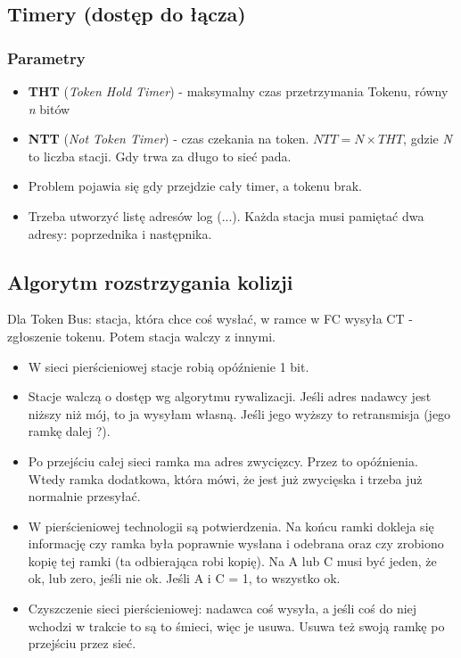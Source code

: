 			\subsection{Timery (dostęp do łącza)}
				\subsubsection{Parametry}
					\begin{itemize}
						\item \textbf{THT} (\emph{Token Hold Timer}) - maksymalny czas przetrzymania Tokenu, równy \emph{n} bitów
						\item \textbf{NTT} (\emph{Not Token Timer}) - czas czekania na token. $ NTT=N\times THT $, gdzie \emph{N} to liczba stacji. Gdy trwa za długo to sieć pada.
						\item Problem pojawia się gdy przejdzie cały timer, a tokenu brak.
						\item Trzeba utworzyć listę adresów log (...). Każda stacja musi pamiętać dwa adresy: poprzednika i następnika.
					\end{itemize}
			\subsection{Algorytm rozstrzygania kolizji}
				Dla Token Bus: stacja, która chce coś wysłać, w ramce w FC wysyła CT - zgłoszenie tokenu. Potem stacja walczy z innymi.
				\begin{itemize}
					\item W sieci pierścieniowej stacje robią opóźnienie 1 bit.
					\item Stacje walczą o dostęp wg algorytmu rywalizacji. Jeśli adres nadawcy jest niższy niż mój, to ja wysyłam własną. Jeśli jego wyższy to retransmisja (jego ramkę dalej ?).
					\item Po przejściu całej sieci ramka ma adres zwycięzcy. Przez to opóźnienia. Wtedy ramka dodatkowa, która mówi, że jest już zwycięska i trzeba już normalnie przesyłać.
					\item W pierścieniowej technologii są potwierdzenia. Na końcu ramki dokleja się informację czy ramka była poprawnie wysłana i odebrana oraz czy zrobiono kopię tej ramki (ta odbierająca robi kopię). Na A lub C musi być jeden, że ok, lub zero, jeśli nie ok. Jeśli A i C = 1, to wszystko ok.
					\item Czyszczenie sieci pierścieniowej: nadawca coś wysyła, a jeśli coś do niej wchodzi w trakcie to są to śmieci, więc je usuwa. Usuwa też swoją ramkę po przejściu przez sieć.
				\end{itemize}
